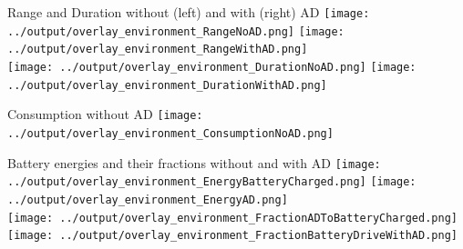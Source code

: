\documentclass{beamer}
\begin{document}
\begin{frame}{Range and Duration without (left) and with (right) AD}
\centering
\texttt{[image: ../output/overlay\_environment\_RangeNoAD.png]}
\texttt{[image: ../output/overlay\_environment\_RangeWithAD.png]}\\
\texttt{[image: ../output/overlay\_environment\_DurationNoAD.png]}
\texttt{[image: ../output/overlay\_environment\_DurationWithAD.png]}\\
\end{frame}

\begin{frame}{Consumption without AD}
\centering
\texttt{[image: ../output/overlay\_environment\_ConsumptionNoAD.png]}
\end{frame}

\begin{frame}{Battery energies and their fractions without and with AD}
\centering
\texttt{[image: ../output/overlay\_environment\_EnergyBatteryCharged.png]}
\texttt{[image: ../output/overlay\_environment\_EnergyAD.png]}\\
\texttt{[image: ../output/overlay\_environment\_FractionADToBatteryCharged.png]}
\texttt{[image: ../output/overlay\_environment\_FractionBatteryDriveWithAD.png]}\\
\end{frame}
\end{document}

